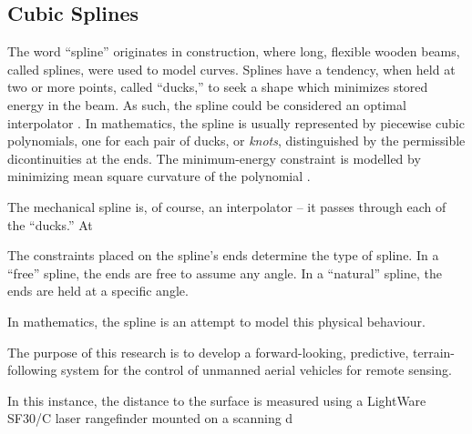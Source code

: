 \documentclass[doc]{apa6}
\begin{document}
\subsection{Cubic Splines}

The word ``spline'' originates in construction, where long, flexible wooden beams, called splines, were used to model curves. Splines have a tendency, when held at two or more points, called ``ducks,'' to seek a shape which minimizes stored energy in the beam. As such, the spline could be considered an optimal interpolator \parencite{Wegman2016}. In mathematics, the spline is usually represented by piecewise cubic polynomials, one for each pair of ducks, or \emph{knots}, distinguished by the permissible dicontinuities at the ends. The minimum-energy constraint is modelled by minimizing mean square curvature of the polynomial \parencite{Wegman2016}.

The mechanical spline is, of course, an interpolator -- it passes through each of the ``ducks.'' At

The constraints placed on the spline's ends determine the type of spline. In a ``free'' spline, the ends are free to assume any angle. In a ``natural'' spline, the ends are held at a specific angle. 

In mathematics, the spline is an attempt to model this physical behaviour. 





The purpose of this research is to develop a forward-looking, predictive, terrain-following system for the control of unmanned aerial vehicles for remote sensing. 


In this instance, the distance to the surface is measured using a LightWare SF30/C laser rangefinder mounted on a scanning d



\newpage

\printbibliography
\end{document}

